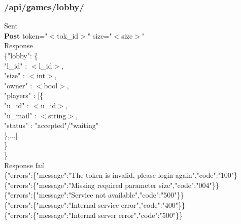\subsubsection{/api/games/lobby/}
\tab	Sent\\
\tab\tab	\textbf{Post} token="$<$tok\_id$>$" size="$<$size$>$"\\
\tab	Response\\
\tab\tab	\{"lobby": \{\\
\tab\tab\tab	"l\_id" : $<$l\_id$>$,\\
\tab\tab\tab	"size" : $<$int$>$,\\
\tab\tab\tab	"owner" : $<$bool$>$,\\
\tab\tab\tab	"players" : $[$\{\\
\tab\tab\tab\tab	"u\_id" : $<$u\_id$>$,\\
\tab\tab\tab\tab	"u\_mail" : $<$string$>$,\\
\tab\tab\tab\tab	"status" : "accepted"/"waiting"\\
\tab\tab\tab\tab	\},...$]$\\
\tab\tab\tab	\}\\
\tab\tab	\}\\
\tab    Response fail\\
\tab\tab	\{"errors":\{"message":"The token is invalid, please login again","code":"100"\}\\
\tab\tab	\{"errors":\{"message":"Missing required parameter size","code":"004"\}\}\\
\tab\tab	\{"errors":\{"message":"Service not available","code":"500"\}\}\\
\tab\tab	\{"errors":\{"message":"Internal service error","code":"400"\}\}\\
\tab\tab	\{"errors":\{"message":"Internal server error","code":"500"\}\}\\


